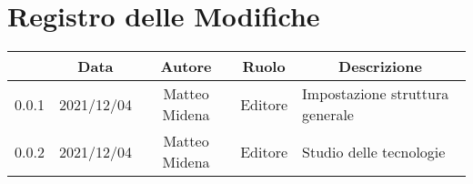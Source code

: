 \thispagestyle{empty}
\section*{Registro delle Modifiche}

\begin{center}
	\renewcommand{\arraystretch}{1.8}
	\begin{longtable}[c]{c | c | c | c | p{5cm}}
		\rowcolor[HTML]{125E28}
		\multicolumn{1}{c}{\color[HTML]{FFFFFF} \textbf{Versione}} & 
		\multicolumn{1}{c}{\color[HTML]{FFFFFF} \textbf{Data}} & 
		\multicolumn{1}{c}{\color[HTML]{FFFFFF} \textbf{Autore}} & 
		\multicolumn{1}{c}{\color[HTML]{FFFFFF} \textbf{Ruolo}} & 
		\multicolumn{1}{c}{\color[HTML]{FFFFFF} \textbf{Descrizione}} \\
		\endhead
		0.0.1 & 2021/12/04 & Matteo Midena & Editore & Impostazione struttura generale\\
		0.0.2 & 2021/12/04 & Matteo Midena & Editore & Studio delle tecnologie\\

	\end{longtable}
\end{center}